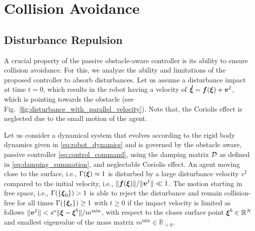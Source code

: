 \section{Collision Avoidance} \label{sec:collision_avoidance}

\subsection{Disturbance Repulsion}
A crucial property of the passive obstacle-aware controller is its ability to ensure collision avoidance. For this, we analyze the ability and limitations of the proposed controller to absorb disturbances.
Let us assume a disturbance impact at time $t=0$, which results in the robot having a velocity of $\boldsymbol{\dot \xi} = \boldsymbol{f}(\boldsymbol{\xi}) + \boldsymbol{v}^I$, which is pointing towards the obstacle (see Fig.~\ref{fig:disturbance_with_parallel_velocity}). 
Note that, the Coriolis effect is neglected due to the small motion of the agent.

\begin{lemma}
	Let us consider a dynamical system that evolves according to the rigid body dynamics given in \eqref{eq:robot_dynamics} and is governed by the obstacle aware, passive controller \eqref{eq:control_command}, using the damping matrix $\mathcal{D}$ as defined in \eqref{eq:damping_summation}, and neglectable Coriolis effect.
    An agent moving close to the surface, i.e., $\Gamma(\boldsymbol{\xi}) \approx 1$ is disturbed by a large disturbance velocity $v^I$ compared to the initial velocity, i.e., $\| \boldsymbol{f}(\boldsymbol{\xi}) \| / \|\boldsymbol{v}^I \| \ll 1 $.
	The motion starting in free space, i.e., $\Gamma( \{\boldsymbol{\xi}_0 \} ) > 1$ is able to reject the disturbance and remain collision-free for all times $\Gamma( \{\boldsymbol{\xi}_t\}) \geq 1$ with $t \geq 0$ if the impact velocity is limited as follows $\| \boldsymbol{v}^I \| < s^{\mathrm{o}} \| \boldsymbol{\xi} - \boldsymbol{\xi}^b \| / m^{\mathrm{min}}$, with respect to the closes surface point $\boldsymbol{\xi}^b \in \mathbb{R}^N$ and smallest eigenvalue of the mass matrix $m^{\mathrm{min}} \in \mathbb{R}_{>0}$.
\end{lemma}


